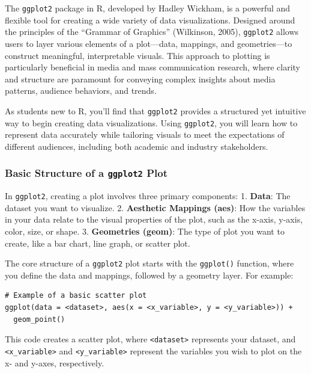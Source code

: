 \documentclass[
]{book}
\begin{document}
The \texttt{ggplot2} package in R, developed by Hadley Wickham, is a powerful and flexible tool for creating a wide variety of data visualizations. Designed around the principles of the ``Grammar of Graphics'' (Wilkinson, 2005), \texttt{ggplot2} allows users to layer various elements of a plot---data, mappings, and geometries---to construct meaningful, interpretable visuals. This approach to plotting is particularly beneficial in media and mass communication research, where clarity and structure are paramount for conveying complex insights about media patterns, audience behaviors, and trends.

As students new to R, you'll find that \texttt{ggplot2} provides a structured yet intuitive way to begin creating data visualizations. Using \texttt{ggplot2}, you will learn how to represent data accurately while tailoring visuals to meet the expectations of different audiences, including both academic and industry stakeholders.

\subsubsection*{\texorpdfstring{Basic Structure of a \texttt{ggplot2} Plot}{Basic Structure of a ggplot2 Plot}}\label{basic-structure-of-a-ggplot2-plot}

In \texttt{ggplot2}, creating a plot involves three primary components: 1. \textbf{Data}: The dataset you want to visualize. 2. \textbf{Aesthetic Mappings (aes)}: How the variables in your data relate to the visual properties of the plot, such as the x-axis, y-axis, color, size, or shape. 3. \textbf{Geometries (geom)}: The type of plot you want to create, like a bar chart, line graph, or scatter plot.

The core structure of a \texttt{ggplot2} plot starts with the \texttt{ggplot()} function, where you define the data and mappings, followed by a geometry layer. For example:

\begin{verbatim}
# Example of a basic scatter plot
ggplot(data = <dataset>, aes(x = <x_variable>, y = <y_variable>)) +
  geom_point()
\end{verbatim}

This code creates a scatter plot, where \texttt{\textless{}dataset\textgreater{}} represents your dataset, and \texttt{\textless{}x\_variable\textgreater{}} and \texttt{\textless{}y\_variable\textgreater{}} represent the variables you wish to plot on the x- and y-axes, respectively.
\end{document}
